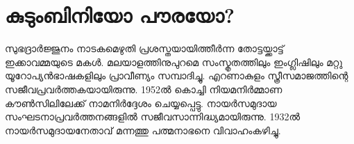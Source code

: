 \chapter{കുടുംബിനിയോ പൗരയോ?}
\label{10}

\label{ch10box3} %
\begin{tcolorbox}[%
 breakable, %
  arc=0mm, 
  left=1pt, right = 1pt, 
  boxrule=0mm,
  colback = {blue!10}, %
] 
സുഭദ്രാർജ്ജുനം നാടകമെഴുതി പ്രശസ്തയായിത്തീർന്ന തോട്ടയ്ക്കാട്ട് ഇക്കാവമ്മയുടെ മകൾ. മലയാളത്തിനുപുറമെ സംസ്കൃതത്തിലും ഇംഗ്ലിഷിലും മറ്റു യൂറോപ്യൻഭാഷകളിലും പ്രാവീണ്യം സമ്പാദിച്ചു. എറണാകുളം സ്ത്രീസമാജത്തിന്റെ സജീവപ്രവർത്തകയായിരുന്നു. 1952ൽ കൊച്ചി നിയമനിർമ്മാണ കൗൺസിലിലേക്ക് നാമനിർദ്ദേശം ചെയ്യപ്പെട്ടു. നായർസമുദായ സംഘടനാപ്രവർത്തനങ്ങളിൽ സജീവസാന്നിദ്ധ്യമായിരുന്നു. 1932ൽ നായർസമുദായനേതാവ് മന്നത്തു പത്മനാഭനെ വിവാഹംകഴിച്ചു.

\end{tcolorbox}

